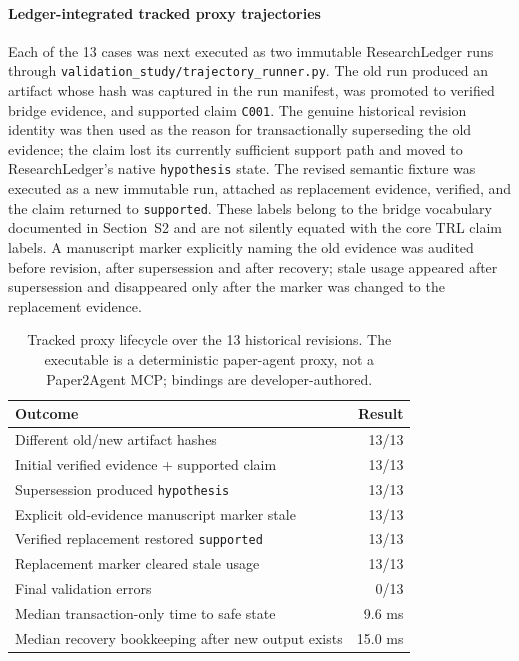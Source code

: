 \documentclass[journal]{IEEEtran}
\begin{document}
\paragraph{Ledger-integrated tracked proxy trajectories} Each of the 13 cases was next executed as two immutable ResearchLedger runs through \texttt{validation\_study/trajectory\_runner.py}. The old run produced an artifact whose hash was captured in the run manifest, was promoted to verified bridge evidence, and supported claim \texttt{C001}. The genuine historical revision identity was then used as the reason for transactionally superseding the old evidence; the claim lost its currently sufficient support path and moved to ResearchLedger's native \texttt{hypothesis} state. The revised semantic fixture was executed as a new immutable run, attached as replacement evidence, verified, and the claim returned to \texttt{supported}. These labels belong to the bridge vocabulary documented in Section~S2 and are not silently equated with the core TRL claim labels. A manuscript marker explicitly naming the old evidence was audited before revision, after supersession and after recovery; stale usage appeared after supersession and disappeared only after the marker was changed to the replacement evidence.

\begin{table}[!t]
\centering
\caption{Tracked proxy lifecycle over the 13 historical revisions. The executable is a deterministic paper-agent proxy, not a Paper2Agent MCP; bindings are developer-authored.}
\label{tab:tracked_proxy_supp}
\scriptsize
\begin{tabularx}{\columnwidth}{>{\raggedright\arraybackslash}Xr}
\toprule
Outcome & Result \\
\midrule
Different old/new artifact hashes & 13/13 \\
Initial verified evidence + supported claim & 13/13 \\
Supersession produced \texttt{hypothesis} & 13/13 \\
Explicit old-evidence manuscript marker stale & 13/13 \\
Verified replacement restored \texttt{supported} & 13/13 \\
Replacement marker cleared stale usage & 13/13 \\
Final validation errors & 0/13 \\
Median transaction-only time to safe state & 9.6 ms \\
Median recovery bookkeeping after new output exists & 15.0 ms \\
\bottomrule
\end{tabularx}
\end{table}
\end{document}
